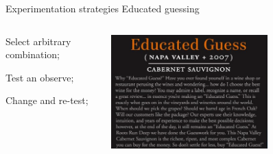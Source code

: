 \documentclass[t]{beamer}
\begin{document}

\begin{ftst}
{Experimentation strategies}
{Educated guessing}
\vspace{-1em}
\begin{columns}[T]
	\begin{block}{}
		\bitems Select arbitrary combination;
			\item Test an observe; 
			\item Change and re-test;
		\eitem
	\end{block}
	\vone
	\centering\includegraphics[width=0.65\textwidth]{../figs/edguess3.png}
\vhalf

\end{columns}
\end{ftst}
\end{document}
